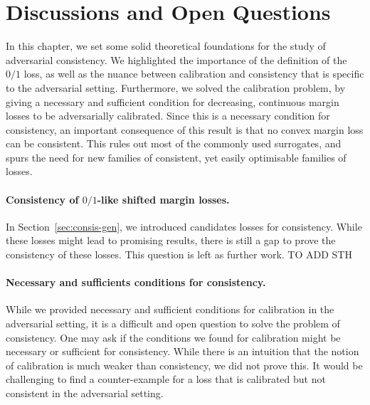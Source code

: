 \section{Discussions and Open Questions}
In this chapter, we set some solid theoretical foundations for the study of adversarial consistency. We highlighted the importance of the definition of the $0/1$ loss, as well as the nuance between calibration and consistency that is specific to the adversarial setting. Furthermore, we solved the calibration problem, by giving a necessary and sufficient condition for decreasing, continuous margin losses to be adversarially calibrated. Since this is a necessary condition for consistency, an important consequence of this result is that no convex margin loss can be consistent. This rules out most of the commonly used surrogates, and spurs the need for new families of consistent, yet easily optimisable families of losses.

\paragraph*{Consistency of $0/1$-like shifted margin losses.} In Section~\ref{sec:consis-gen}, we introduced candidates losses for consistency. While these losses might lead to promising results, there is still a gap to prove the consistency of these losses. This question is left as further work. TO ADD STH



\paragraph*{Necessary and sufficients conditions for consistency.} While we provided necessary and sufficient conditions for calibration in the adversarial setting, it is a difficult and open question to solve the problem of consistency. One may ask if the conditions we found for calibration might be necessary or sufficient for consistency. While there is an intuition that the notion of calibration is much weaker than consistency, we did not prove this. It would be challenging to find a counter-example for a loss that is calibrated but not consistent in the adversarial setting.